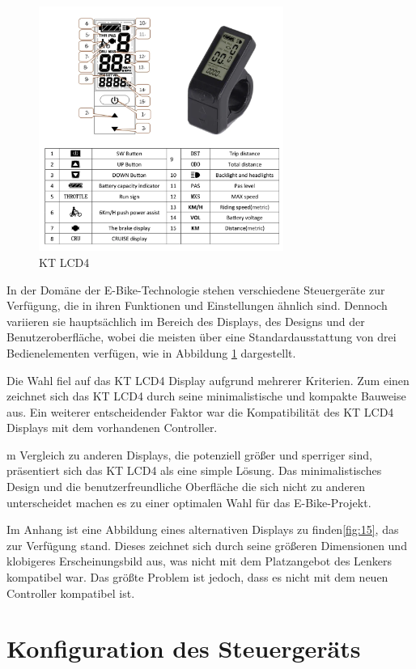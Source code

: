 \begin{figure}[h]
    \centering
    \includegraphics[width=8cm]{images/Elektrische-Bike-Display-KT-LCD4.png}
    \caption{KT LCD4\cite{noauthor_2822_nodate}}%
    \label{fig:14}
\end{figure}

In der Domäne der E-Bike-Technologie stehen verschiedene Steuergeräte zur Verfügung, die in ihren Funktionen und Einstellungen ähnlich sind. Dennoch variieren sie hauptsächlich im Bereich des Displays, des Designs und der Benutzeroberfläche, wobei die meisten über eine Standardausstattung von drei Bedienelementen verfügen, wie in Abbildung \ref{fig:14} dargestellt.

Die Wahl fiel auf das KT LCD4 Display aufgrund mehrerer Kriterien. Zum einen zeichnet sich das KT LCD4 durch seine minimalistische und kompakte Bauweise aus. Ein weiterer entscheidender Faktor war die Kompatibilität des KT LCD4 Displays mit dem vorhandenen Controller.

m Vergleich zu anderen Displays, die potenziell größer und sperriger sind, präsentiert sich das KT LCD4 als eine simple Lösung. Das minimalistisches Design und die benutzerfreundliche Oberfläche die sich nicht zu anderen unterscheidet machen es zu einer optimalen Wahl für das E-Bike-Projekt.

Im Anhang ist eine Abbildung eines alternativen Displays zu finden\ref{fig:15}, das zur Verfügung stand. Dieses zeichnet sich durch seine größeren Dimensionen und klobigeres Erscheinungsbild aus, was nicht mit dem Platzangebot des Lenkers kompatibel war. Das größte Problem ist jedoch, dass es nicht mit dem neuen Controller kompatibel ist.





\section{Konfiguration des Steuergeräts}






